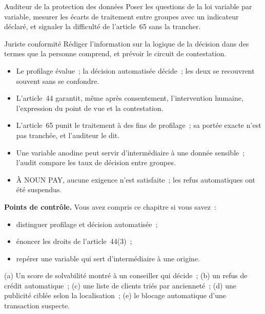 \begin{boxmetier}{Auditeur de la protection des données}
Poser les questions de la loi variable par variable, mesurer les écarts de
traitement entre groupes avec un indicateur déclaré, et signaler la
difficulté de l'article~65 sans la trancher.
\end{boxmetier}

\begin{boxmetier}{Juriste conformité}
Rédiger l'information sur la logique de la décision dans des termes que la
personne comprend, et prévoir le circuit de contestation.
\end{boxmetier}

\begin{boxresume}
\begin{itemize}
    \item Le profilage évalue~; la décision automatisée décide~; les deux
          se recouvrent souvent sans se confondre.
    \item L'article~44 garantit, même après consentement, l'intervention
          humaine, l'expression du point de vue et la contestation.
    \item L'article~65 punit le traitement à des fins de profilage~; sa
          portée exacte n'est pas tranchée, et l'auditeur le dit.
    \item Une variable anodine peut servir d'intermédiaire à une donnée
          sensible~; l'audit compare les taux de décision entre groupes.
    \item À NOUN PAY, aucune exigence n'est satisfaite~; les refus
          automatiques ont été suspendus.
\end{itemize}
\end{boxresume}

\begin{boxinfo}
\textbf{Points de contrôle.} Vous avez compris ce chapitre si vous savez~:
\begin{itemize}
    \item distinguer profilage et décision automatisée~;
    \item énoncer les droits de l'article~44(3)~;
    \item repérer une variable qui sert d'intermédiaire à une origine.
\end{itemize}
\end{boxinfo}

\begin{boxexo}[title={\ding{45}\quad Exercice~17.1. Profilage, décision, ni l'un ni l'autre \niveaubase}]
(a) Un score de solvabilité montré à un conseiller qui décide~; (b) un
refus de crédit automatique~; (c) une liste de clients triés par ancienneté~;
(d) une publicité ciblée selon la localisation~; (e) le blocage automatique
d'une transaction suspecte.
\end{boxexo}

